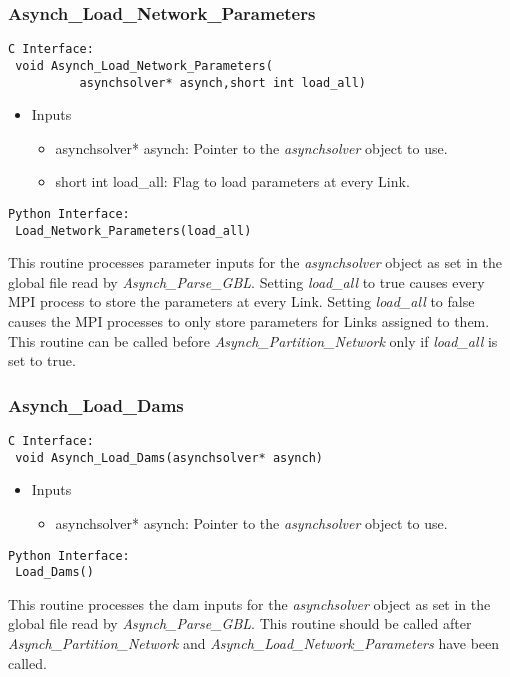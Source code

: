 \documentclass[12pt]{article}
\begin{document}
\subsubsection{Asynch\_Load\_Network\_Parameters} \label{sec: asynch_load_network_parameters}

\begin{lstlisting}[style=CStyle]
 C Interface:
 void Asynch_Load_Network_Parameters(
	      asynchsolver* asynch,short int load_all)
\end{lstlisting}
\begin{itemize}
 \item Inputs
  \begin{itemize}
   \item asynchsolver* asynch: Pointer to the \emph{asynchsolver} object to use.
   \item short int load\_all: Flag to load parameters at every Link.
  \end{itemize}
\end{itemize}
\begin{lstlisting}[style=PythonStyle]
 Python Interface:
 Load_Network_Parameters(load_all)
\end{lstlisting}
This routine processes parameter inputs for the \emph{asynchsolver} object as set in the global file read by \emph{Asynch\_Parse\_GBL}. Setting \emph{load\_all} to true causes every MPI process to store the parameters at every Link. Setting \emph{load\_all} to false causes the MPI processes to only store parameters for Links assigned to them. This routine can be called before \emph{Asynch\_Partition\_Network} only if \emph{load\_all} is set to true.


\subsubsection{Asynch\_Load\_Dams} \label{sec: asynch_load_dams}

\begin{lstlisting}[style=CStyle]
 C Interface:
 void Asynch_Load_Dams(asynchsolver* asynch)
\end{lstlisting}
\begin{itemize}
 \item Inputs
  \begin{itemize}
   \item asynchsolver* asynch: Pointer to the \emph{asynchsolver} object to use.
  \end{itemize}
\end{itemize}
\begin{lstlisting}[style=PythonStyle]
 Python Interface:
 Load_Dams()
\end{lstlisting}
This routine processes the dam inputs for the \emph{asynchsolver} object as set in the global file read by \emph{Asynch\_Parse\_GBL}. This routine should be called after \emph{Asynch\_Partition\_Network} and \emph{Asynch\_Load\_Network\_Parameters} have been called.
\end{document}
